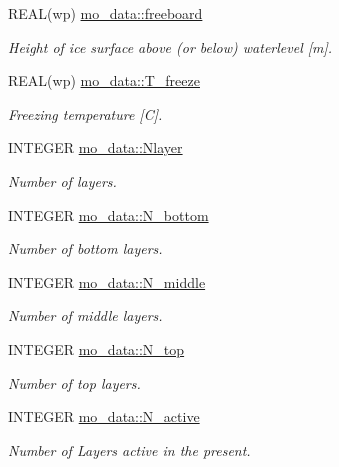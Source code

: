\begin{DoxyCompactItemize}
REAL(wp) \hyperlink{namespacemo__data_aef61c6317d4baba778438cea10b64412}{mo\_\-data::freeboard}
\begin{DoxyCompactList}\small\item\em Height of ice surface above (or below) waterlevel \mbox{[}m\mbox{]}. \item\end{DoxyCompactList}\item 
REAL(wp) \hyperlink{namespacemo__data_a75b714d38b619ba4c6608d8f833cf159}{mo\_\-data::T\_\-freeze}
\begin{DoxyCompactList}\small\item\em Freezing temperature \mbox{[}C\mbox{]}. \item\end{DoxyCompactList}\item 
INTEGER \hyperlink{namespacemo__data_ab0b091ff23970ff2939892c9d8f788f1}{mo\_\-data::Nlayer}
\begin{DoxyCompactList}\small\item\em Number of layers. \item\end{DoxyCompactList}\item 
INTEGER \hyperlink{namespacemo__data_a9c89af560a3d2f1fe1027bf81125b16c}{mo\_\-data::N\_\-bottom}
\begin{DoxyCompactList}\small\item\em Number of bottom layers. \item\end{DoxyCompactList}\item 
INTEGER \hyperlink{namespacemo__data_a1140e1d6804c776a152d059c6ecd8375}{mo\_\-data::N\_\-middle}
\begin{DoxyCompactList}\small\item\em Number of middle layers. \item\end{DoxyCompactList}\item 
INTEGER \hyperlink{namespacemo__data_a4be9ef8c44dfc2c8fccc353a2fc5fc79}{mo\_\-data::N\_\-top}
\begin{DoxyCompactList}\small\item\em Number of top layers. \item\end{DoxyCompactList}\item 
INTEGER \hyperlink{namespacemo__data_adcca7f2476501b41d758129cc352af3b}{mo\_\-data::N\_\-active}
\begin{DoxyCompactList}\small\item\em Number of Layers active in the present. \item\end{DoxyCompactList}\item 

\end{DoxyCompactItemize}
